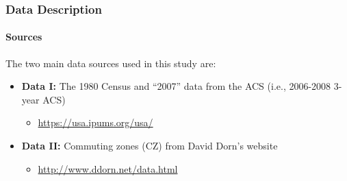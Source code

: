 
\begin{frame}
    \frametitle{Data Description}
    \framesubtitle{Sources}
    The two main data sources used in this study are:
    \begin{itemize}
        \item \textbf{Data I:} The 1980 Census and “2007” data from the ACS (i.e., 2006-2008 3-year ACS)
        \begin{itemize}
            \item \url{https://usa.ipums.org/usa/}
        \end{itemize}
        \item \textbf{Data II:} Commuting zones (CZ) from David Dorn's website
        \begin{itemize}
            \item \url{http://www.ddorn.net/data.html}
        \end{itemize}
    \end{itemize}
\end{frame}

